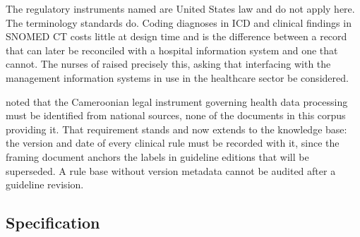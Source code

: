 \documentclass[12pt,a4paper,oneside]{report}
\begin{document}
The regulatory instruments named are United States law and do not apply here. The terminology standards do. Coding diagnoses in ICD and clinical findings in SNOMED CT costs little at design time and is the difference between a record that can later be reconciled with a hospital information system and one that cannot. The nurses of \textcite{mucchi2021} raised precisely this, asking that interfacing with the management information systems in use in the healthcare sector be considered.

 noted that the Cameroonian legal instrument governing health data processing must be identified from national sources, none of the documents in this corpus providing it. That requirement stands and now extends to the knowledge base: the version and date of every clinical rule must be recorded with it, since the framing document anchors the labels in guideline editions that will be superseded. A rule base without version metadata cannot be audited after a guideline revision.

\subsection{Specification}\label{sec:spec24}
\end{document}
